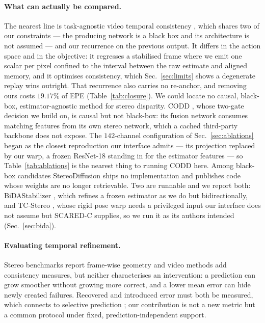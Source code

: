 \documentclass[letterpaper,10pt,conference]{ieeeconf}
\begin{document}
\paragraph{What can actually be compared.}
The nearest line is task-agnostic video temporal consistency
\cite{lai2018blind}, which shares two of our constraints --- the producing
network is a black box and its architecture is not assumed --- and our
recurrence on the previous output. It differs in
the action space and in the objective: it regresses a stabilised frame where
we emit one scalar per pixel confined to the interval between the raw estimate
and aligned memory, and it optimises consistency, which
Sec.~\ref{sec:limits} shows a degenerate replay wins outright. That
recurrence also carries no re-anchor, and removing ours costs $19.17\%$ of EPE
(Table~\ref{tab:closure}). We could locate no causal, black-box,
estimator-agnostic method for stereo disparity.
CODD \cite{li2023codd}, whose two-gate decision we
build on, is causal but not black-box: its fusion network consumes matching
features from its own stereo network, which a cached third-party backbone
does not expose. The $142$-channel configuration of
Sec.~\ref{sec:ablations} began as the closest reproduction our interface
admits --- its projection replaced by our warp, a frozen ResNet-18 standing
in for the estimator features --- so Table~\ref{tab:ablations} is the nearest
thing to running CODD here. Among black-box candidates StereoDiffusion
\cite{xu2024stereodiffusion} ships no implementation and
\cite{aleotti2021ndr} publishes code whose weights are no longer
retrievable. Two are runnable and we report both:
BiDAStabilizer \cite{jing2024bida}, which refines a frozen estimator as we do
but bidirectionally, and TC-Stereo \cite{zeng2024tcstereo}, whose rigid
pose warp needs a privileged input our interface does not assume but SCARED-C
supplies, so we run it as its authors intended (Sec.~\ref{sec:bida}).

\paragraph{Evaluating temporal refinement.}
Stereo benchmarks report frame-wise geometry and video methods add consistency
measures, but neither characterises an intervention: a prediction can grow
smoother without growing more correct, and a lower mean error can hide newly
created failures. Recovered and introduced error must
both be measured, which connects to selective prediction
\cite{geifman2019selectivenet}; our contribution is not a new metric but a
common protocol under fixed, prediction-independent support.
\end{document}
